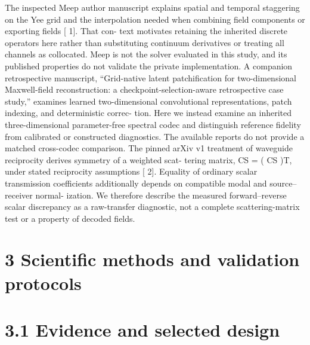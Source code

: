 \documentclass[11pt]{article}
\begin{document}
The inspected Meep author manuscript explains spatial and temporal staggering on the Yee grid
and the interpolation needed when combining field components or exporting fields [ 1]. That con-
text motivates retaining the inherited discrete operators here rather than substituting continuum
derivatives or treating all channels as collocated. Meep is not the solver evaluated in this study,
and its published properties do not validate the private implementation.
A companion retrospective manuscript, “Grid-native latent patchification for two-dimensional
Maxwell-field reconstruction: a checkpoint-selection-aware retrospective case study,” examines
learned two-dimensional convolutional representations, patch indexing, and deterministic correc-
tion. Here we instead examine an inherited three-dimensional parameter-free spectral codec and
distinguish reference fidelity from calibrated or constructed diagnostics. The available reports do
not provide a matched cross-codec comparison.
The pinned arXiv v1 treatment of waveguide reciprocity derives symmetry of a weighted scat-
tering matrix, CS = ( CS )T, under stated reciprocity assumptions [ 2]. Equality of ordinary scalar
transmission coefficients additionally depends on compatible modal and source–receiver normal-
ization. We therefore describe the measured forward–reverse scalar discrepancy as a raw-transfer
diagnostic, not a complete scattering-matrix test or a property of decoded fields.

\section*{3 Scientific methods and validation protocols}


\section*{3.1 Evidence and selected design}
\end{document}
